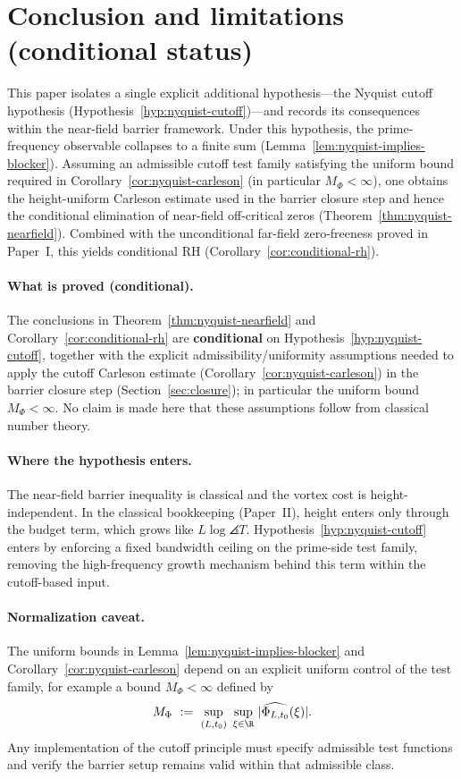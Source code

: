 \documentclass[11pt]{article}
\begin{document}
\section*{Conclusion and limitations (conditional status)}

This paper isolates a single explicit additional hypothesis---the Nyquist cutoff hypothesis (Hypothesis~\ref{hyp:nyquist-cutoff})---and records its consequences within the near-field barrier framework.
Under this hypothesis, the prime-frequency observable collapses to a finite sum (Lemma~\ref{lem:nyquist-implies-blocker}).
Assuming an admissible cutoff test family satisfying the uniform bound required in Corollary~\ref{cor:nyquist-carleson} (in particular $M_\Phi<\infty$), one obtains the height-uniform Carleson estimate used in the barrier closure step and hence the conditional elimination of near-field off-critical zeros (Theorem~\ref{thm:nyquist-nearfield}).
Combined with the unconditional far-field zero-freeness proved in Paper~I, this yields conditional RH (Corollary~\ref{cor:conditional-rh}).

\paragraph{What is proved (conditional).}
The conclusions in Theorem~\ref{thm:nyquist-nearfield} and Corollary~\ref{cor:conditional-rh} are \textbf{conditional} on Hypothesis~\ref{hyp:nyquist-cutoff}, together with the explicit admissibility/uniformity assumptions needed to apply the cutoff Carleson estimate (Corollary~\ref{cor:nyquist-carleson}) in the barrier closure step (Section~\ref{sec:closure}); in particular the uniform bound $M_\Phi<\infty$.
No claim is made here that these assumptions follow from classical number theory.

\paragraph{Where the hypothesis enters.}
The near-field barrier inequality is classical and the vortex cost is height-independent.
In the classical bookkeeping (Paper~II), height enters only through the budget term, which grows like $L\log\angles{T}$.
Hypothesis~\ref{hyp:nyquist-cutoff} enters by enforcing a fixed bandwidth ceiling on the prime-side test family, removing the high-frequency growth mechanism behind this term within the cutoff-based input.

\paragraph{Normalization caveat.}
The uniform bounds in Lemma~\ref{lem:nyquist-implies-blocker} and Corollary~\ref{cor:nyquist-carleson} depend on an explicit uniform control of the test family, for example a bound $M_\Phi<\infty$ defined by
\[
  M_\Phi\ :=\ \sup_{(L,t_0)}\ \sup_{\xi\in\R}\,|\widehat{\Phi_{L,t_0}}(\xi)|.
\]
Any implementation of the cutoff principle must specify admissible test functions and verify the barrier setup remains valid within that admissible class.
\end{document}
